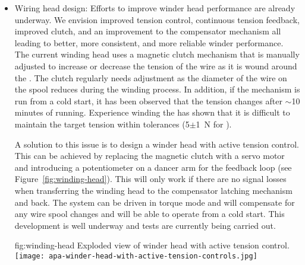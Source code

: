 \begin{itemize}

\item Wiring head design: Efforts to improve winder head performance are already underway. We envision improved tension control, continuous tension feedback, improved clutch, and an improvement to the compensator mechanism all leading to better, more consistent, and more reliable winder performance.  The current winding head uses a magnetic clutch mechanism that is manually adjusted to increase or decrease the tension of the wire as it is wound around the . The clutch regularly needs adjustment as the diameter of the wire on the spool reduces during the winding process. In addition, if the mechanism is run from a cold start, it has been observed that the tension changes after $\sim$10 minutes of running. Experience winding the   has shown that it is difficult to maintain the target tension within tolerances (5$\pm$\SI{1}{N} for ).

A solution to this issue is to design a winder head with active tension control. This can be achieved by replacing the magnetic clutch with a servo motor and introducing a potentiometer on a dancer arm for the feedback loop (see Figure~\ref{fig:winding-head}). This will only work if there are no signal losses when transferring the winding head to the compensator latching mechanism and back. The system can be driven in torque mode and will compensate for any wire spool changes and will be able to operate from a cold start. This development is well underway and tests are currently being carried out.

\begin{dunefigure}{fig:winding-head}
{Exploded view of winder head with active tension control.}
\texttt{[image: apa-winder-head-with-active-tension-controls.jpg]}
\end{dunefigure}


\end{itemize}
